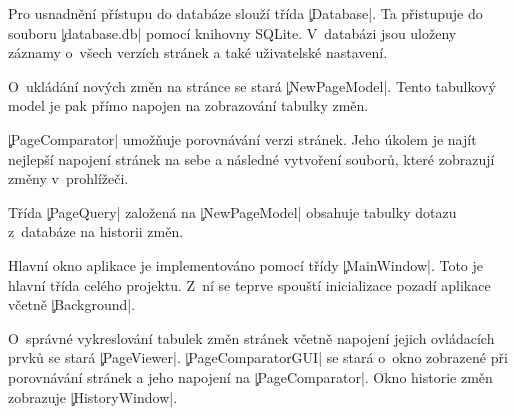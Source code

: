 Pro usnadnění přístupu do databáze slouží třída \c|Database|.
Ta přistupuje do souboru \c|database.db| %
pomocí knihovny SQLite.
V~databázi jsou uloženy záznamy o~všech verzích stránek a také uživatelské nastavení.

O~ukládání nových změn na stránce se stará \c|NewPageModel|. Tento tabulkový model je pak přímo napojen na zobrazování tabulky změn.

\c|PageComparator| umožňuje porovnávání verzi stránek.
Jeho úkolem je najít nejlepší napojení stránek na sebe a následné vytvoření souborů, které zobrazují změny v~prohlížeči.

Třída \c|PageQuery| založená na \c|NewPageModel| obsahuje tabulky dotazu z~databáze na historii změn.

Hlavní okno aplikace je implementováno pomocí třídy \c|MainWindow|. Toto je hlavní třída celého projektu.
Z~ní se teprve spouští inicializace pozadí aplikace včetně \c|Background|.

O~správné vykreslování tabulek změn stránek včetně napojení jejich ovládacích prvků se stará \c|PageViewer|.
\c|PageComparatorGUI| se stará o~okno zobrazené při porovnávání stránek a jeho napojení na \c|PageComparator|.
Okno historie změn zobrazuje \c|HistoryWindow|.


